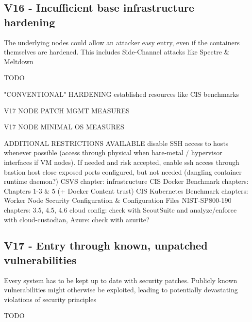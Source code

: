 
\subsection{V16 - Incufficient base infrastructure hardening}
The underlying nodes could allow an attacker easy entry, even if the containers themselves are hardened. This includes Side-Channel attacks like Spectre \& Meltdown

TODO

"CONVENTIONAL" HARDENING
	established resources like CIS benchmarks

V17 NODE PATCH MGMT MEASURES

V17 NODE MINIMAL OS MEASURES
	
ADDITIONAL RESTRICTIONS AVAILABLE
	disable SSH access to hosts whenever possible (access through physical when bare-metal / hypervisor interfaces if VM nodes). If needed and risk accepted, enable ssh access through bastion host
	close exposed ports configured, but not needed (dangling container runtime daemon?)
	CSVS chapter: infrastructure
	CIS Docker Benchmark chapters: Chapters 1-3 \& 5 (+ Docker Content trust)
	CIS Kubernetes Benchmark chapters: Worker Node Security Configuration \& Configuration Files
	NIST-SP800-190 chapters: 3.5, 4.5, 4.6
	cloud config: check with ScoutSuite and analyze/enforce with cloud-custodian, Azure: check with azurite?

\subsection{V17 - Entry through known, unpatched vulnerabilities}
Every system has to be kept up to date with  security patches. Publicly known vulnerabilities might otherwise be exploited, leading to potentially devastating violations of security principles

TODO


